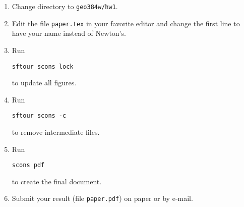 \begin{enumerate}
\item Change directory to \verb#geo384w/hw1#.
\item Edit the file \texttt{paper.tex} in your favorite editor and change the
first line to have your name instead of Newton's.
\item Run
\begin{verbatim}
sftour scons lock
\end{verbatim}
to update all figures.
\item Run
\begin{verbatim}
sftour scons -c
\end{verbatim}
  to remove intermediate files.
\item Run
\begin{verbatim} 
scons pdf
\end{verbatim}
to create the final document.
\item Submit your result (file \texttt{paper.pdf}) on paper or by
  e-mail.
\end{enumerate}


